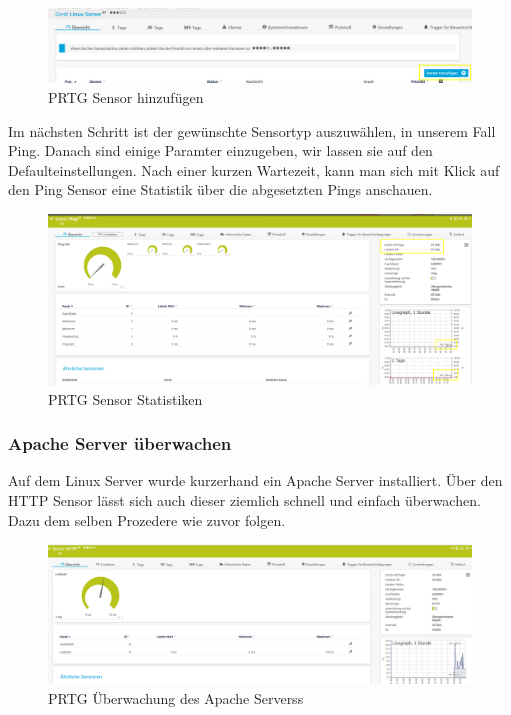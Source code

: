\begin{figure}[!htb]
\centering
\includegraphics{./images/prtg_add_sensor.png}
\caption{PRTG Sensor hinzufügen}
\end{figure}

Im nächsten Schritt ist der gewünschte Sensortyp auszuwählen, in unserem
Fall Ping. Danach sind einige Paramter einzugeben, wir lassen sie auf
den Defaulteinstellungen. Nach einer kurzen Wartezeit, kann man sich mit
Klick auf den Ping Sensor eine Statistik über die abgesetzten Pings
anschauen.

\begin{figure}[!htb]
\centering
\includegraphics{./images/prtg_ping_statistik.png}
\caption{PRTG Sensor Statistiken}
\end{figure}

\hypertarget{apache-server-uxfcberwachen}{%
\subsubsection{Apache Server
überwachen}\label{apache-server-uxfcberwachen}}

Auf dem Linux Server wurde kurzerhand ein Apache Server installiert.
Über den HTTP Sensor lässt sich auch dieser ziemlich schnell und einfach
überwachen. Dazu dem selben Prozedere wie zuvor folgen.

\begin{figure}[!htb]
\centering
\includegraphics{./images/prtg_http.png}
\caption{PRTG Überwachung des Apache Serverss}
\end{figure}

